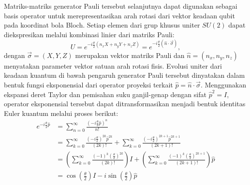 Matriks-matriks generator Pauli tersebut selanjutnya dapat digunakan sebagai basis operator untuk merepresentasikan arah rotasi dari vektor keadaan qubit pada koordinat bola Bloch. Setiap elemen dari grup khusus uniter $SU(2)$ dapat diekspresikan melalui kombinasi linier dari matriks Pauli:
\begin{equation}
    \label{eq:gerbang_pauli_basis}
U = e^{-i\frac{\theta}{2}(n_x X + n_y Y + n_z Z)} = e^{-i\frac{\theta}{2}(\hat{n}\cdot\vec{\sigma})},
\end{equation}
dengan $\vec{\sigma} = (X, Y, Z)$ merupakan vektor matriks Pauli dan $\hat{n} = (n_x, n_y, n_z)$ menyatakan parameter vektor satuan arah rotasi fisis. Evolusi uniter dari keadaan kuantum di bawah pengaruh generator Pauli tersebut dinyatakan dalam bentuk fungsi eksponensial dari operator proyeksi terkait $\hat{p} = \hat{n}\cdot\vec{\sigma}$. Menggunakan ekspansi deret Taylor dan pemisahan suku ganjil-genap dengan sifat $\hat{p}^2=I$, operator eksponensial tersebut dapat ditransformasikan menjadi bentuk identitas Euler kuantum melalui proses berikut:
\begin{equation}
\begin{split}
    e^{-i \frac{\theta}{2}\hat{p}} &= \sum_{n=0}^\infty \frac{(-i \frac{\theta}{2}\hat{p})^n}{n!} \\
    &= \sum_{k=0}^\infty \frac{(-i \frac{\theta}{2})^{2k} \hat{p}^{2k}}{(2k)!} + \sum_{k=0}^\infty \frac{(-i \frac{\theta}{2})^{2k+1} \hat{p}^{2k+1}}{(2k+1)!} \\
    &= \left( \sum_{k=0}^\infty \frac{(-1)^{k} (\frac{\theta}{2})^{2k}}{(2k)!} \right) I + \left( \sum_{k=0}^\infty \frac{(-1)^{k} (\frac{\theta}{2})^{2k+1}}{(2k+1)!} \right) \hat{p} \\
    &= \cos\left(\frac{\theta}{2}\right) I - i \sin\left(\frac{\theta}{2}\right) \hat{p}
\end{split}
\end{equation}

